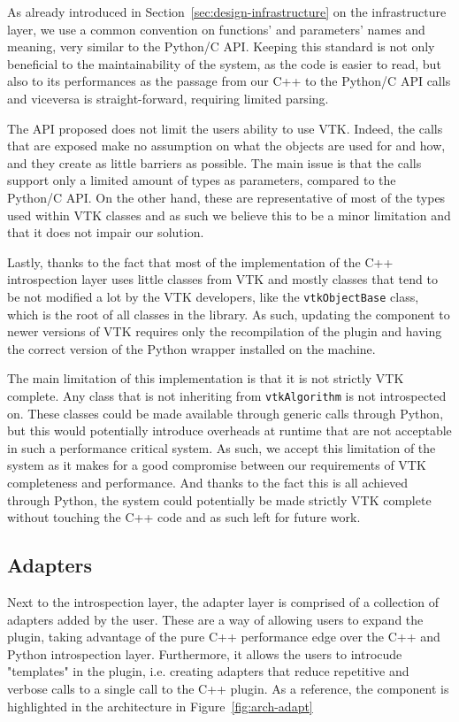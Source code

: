 As already introduced in Section~\ref{sec:design-infrastructure} on the infrastructure layer, we use a common convention on functions' and parameters' names and meaning, very similar to the Python/C API. Keeping this standard is not only beneficial to the maintainability of the system, as the code is easier to read, but also to its performances as the passage from our C++ to the Python/C API calls and viceversa is straight-forward, requiring limited parsing.

The API proposed does not limit the users ability to use VTK. Indeed, the calls that are exposed make no assumption on what the objects are used for and how, and they create as little barriers as possible. The main issue is that the calls support only a limited amount of types as parameters, compared to the Python/C API. On the other hand, these are representative of most of the types used within VTK classes and as such we believe this to be a minor limitation and that it does not impair our solution.

Lastly, thanks to the fact that most of the implementation of the C++ introspection layer uses little classes from VTK and mostly classes that tend to be not modified a lot by the VTK developers, like the \verb|vtkObjectBase| class, which is the root of all classes in the library. As such, updating the component to newer versions of VTK requires only the recompilation of the plugin and having the correct version of the Python wrapper installed on the machine.

The main limitation of this implementation is that it is not strictly VTK complete. Any class that is not inheriting from \verb|vtkAlgorithm| is not introspected on. These classes could be made available through generic calls through Python, but this would potentially introduce overheads at runtime that are not acceptable in such a performance critical system. As such, we accept this limitation of the system as it makes for a good compromise between our requirements of VTK completeness and performance. And thanks to the fact this is all achieved through Python, the system could potentially be made strictly VTK complete without touching the C++ code and as such left for future work.

\subsection{Adapters}
\label{sec:design-adapters}

Next to the introspection layer, the adapter layer is comprised of a collection of adapters added by the user. These are a way of allowing users to expand the plugin, taking advantage of the pure C++ performance edge over the C++ and Python introspection layer. Furthermore, it allows the users to introcude "templates" in the plugin, i.e. creating adapters that reduce repetitive and verbose calls to a single call to the C++ plugin. As a reference, the component is highlighted in the architecture in Figure~\ref{fig:arch-adapt}


